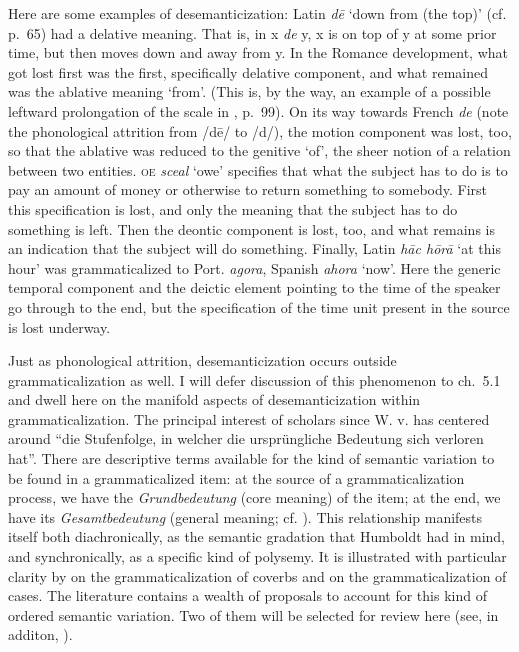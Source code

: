 Here are some examples of desemanticization: Latin \textit{d\=e} ‘down from (the top)’ (cf. p.~65) had a delative meaning. That is, in x \textit{de} y, x is on top of y at some prior time, but then moves down and away from y. In the Romance development, what got lost first was the first, specifically delative component, and what remained was the ablative meaning ‘from’. (This is, by the way, an example of a possible leftward prolongation of the scale in , p.~99). On its way towards French \textit{de} (note the phonological attrition from /d\=e/ to /d/), the motion component was lost, too, so that the ablative was reduced to the genitive ‘of’, the sheer notion of a relation between two entities. \textsc{oe} \textit{sceal} ‘owe’ specifies that what the subject has to do is to pay an amount of money or otherwise to return something to somebody. First this specification is lost, and only the meaning that the subject has to do something is left. Then the deontic component is lost, too, and what remains is an indication that the subject will do something. Finally, Latin \textit{h\=ac h\=or\=a} ‘at this hour’ was grammaticalized to Port. \textit{agora}, Spanish \textit{ahora} ‘now’. Here the generic temporal component and the deictic element pointing to the time of the speaker go through to the end, but the specification of the time unit present in the source is lost underway.

Just as phonological attrition, desemanticization occurs outside grammaticalization as well. I will defer discussion of this phenomenon to ch.~5.1 and dwell here on the manifold aspects of desemanticization within grammaticalization. The principal interest of scholars since W. v. \citet[52]{Humboldt1822} has centered around “die Stufenfolge, in welcher die ursprüngliche Bedeutung sich verloren hat”.  There are descriptive terms available for the kind of semantic variation to be found in a grammaticalized item: at the source of a grammaticalization process, we have the \textit{Grundbedeutung} (core meaning) of the item; at the end, we have its \textit{Gesamtbedeutung} (general meaning; cf. \citet{Jakobson1936}). This relationship manifests itself both diachronically, as the semantic gradation that Humboldt had in mind, and synchronically, as a specific kind of polysemy. It is illustrated with particular clarity by  on the grammaticalization of coverbs and  on the grammaticalization of cases. The literature contains a wealth of proposals to account for this kind of ordered semantic variation. Two of them will be selected for review here (see, in additon, \citet{Traugott1980}).

